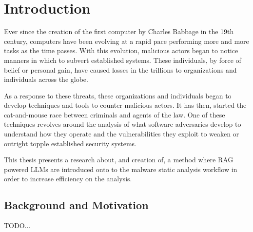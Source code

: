 \chapter{Introduction}
\label{sec:Introduction}
\label{Chapter1} %

Ever since the creation of the first computer by Charles Babbage in the 19th century, computers
have been evolving at a rapid pace performing more and more tasks as the time passes. With this
evolution, malicious actors began to notice manners in which to subvert established systems. These
individuals, by force of belief or personal gain, have caused losses in the trillions to
organizations and individuals across the globe.

As a response to these threats, these organizations and individuals began to develop techniques and
tools to counter malicious actors. It has then, started the cat-and-mouse race between criminals
and agents of the law. One of these techniques revolves around the analysis of what software
adversaries develop to understand how they operate and the vulnerabilities they exploit to weaken
or outright topple established security systems.

This thesis presents a research about, and creation of, a method where RAG powered LLMs are
introduced onto to the malware static analysis workflow in order to increase efficiency on the
analysis.

\section{Background and Motivation}
TODO...

